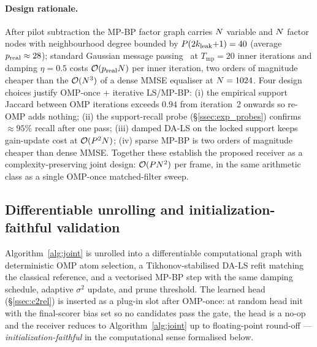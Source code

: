 \paragraph{Design rationale.}
After pilot subtraction the MP-BP factor graph carries $N$ variable
and $N$ factor nodes with neighbourhood degree bounded by
$P(2k_{\mathrm{leak}}{+}1)=40$ (average $p_{\mathrm{real}}\approx 28$); standard
Gaussian message passing~\cite{wymeersch2007iterativereceiver,kschischang2001factorgraph}
at $T_\text{mp}=20$ inner iterations and damping $\eta=0.5$ costs
$\mathcal{O}(p_{\mathrm{real}}N)$ per inner iteration, two orders of magnitude
cheaper than the $\mathcal{O}(N^3)$ of a dense MMSE equaliser at
$N=1024$. Four design choices justify OMP-once + iterative LS/MP-BP:
(i) the empirical support Jaccard between OMP iterations exceeds $0.94$
from iteration~2 onwards so re-OMP adds nothing; (ii) the support-recall
probe (\S\ref{ssec:exp_probes}) confirms $\approx 95\%$ recall after one
pass; (iii) damped DA-LS on the locked support keeps gain-update cost at
$\mathcal{O}(P^2N)$; (iv) sparse MP-BP is two orders of
magnitude cheaper than dense MMSE. Together these establish the
proposed receiver as a complexity-preserving joint design:
$\mathcal{O}(PN^2)$ per frame, in the same arithmetic class as
a single OMP-once matched-filter sweep.

\subsection{Differentiable unrolling and initialization-faithful validation}
\label{ssec:unrolling}

Algorithm~\ref{alg:joint} is unrolled into a differentiable computational
graph with deterministic OMP atom selection, a Tikhonov-stabilised
DA-LS refit matching the classical reference, and a vectorised MP-BP
step with the same damping schedule, adaptive $\sigma^2$ update, and
prune threshold. The learned head (\S\ref{ssec:c2rel}) is inserted as a
plug-in slot after OMP-once: at random head init with the final-scorer
bias set so no candidates pass the gate, the head is a no-op and the
receiver reduces to Algorithm~\ref{alg:joint} up to floating-point
round-off ---
\emph{initialization-faithful} in the computational sense formalised
below.

